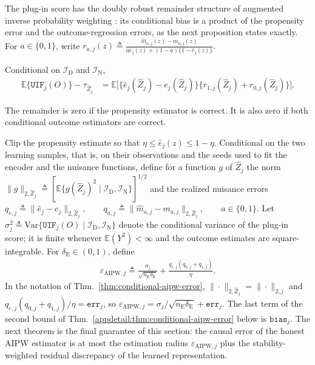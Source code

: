 The plug-in score has the doubly robust remainder structure of augmented inverse probability weighting \citep{chernozhukov2017double,kennedy2022semiparametric}: its conditional bias is a product of the propensity error and the outcome-regression errors, as the next proposition states exactly. For $a\in\{0,1\}$, write
\(r_{a,j}(z) \triangleq \frac{\widehat m_{a,j}(z)-m_{a,j}(z)} {a\widehat e_j(z)+(1-a)\{1-\widehat e_j(z)\}}.\)
\begin{proposition}
\label{appdetail:prop:aipw-remainder}
\normalfont
Conditional on $\mathcal I_{\mathrm D}$ and $\mathcal I_{\mathrm N}$,
\begin{align}
\mathbb E\{\mathtt{UIF}_j(O)\}-\tau_{\widehat Z_j} &= \mathbb E\Big[ \{\widehat e_j(\widehat Z_j)-e_j(\widehat Z_j)\} \{r_{1,j}(\widehat Z_j)+r_{0,j}(\widehat Z_j)\} \Big].
\label{eq:aipw-remainder}
\end{align}
\end{proposition}

The remainder is zero if the propensity estimator is correct. It is also zero if both conditional outcome estimators are correct.

Clip the propensity estimate so that $\eta\le\widehat e_j(z)\le1-\eta$. Conditional on the two learning samples, that is, on their observations and the seeds used to fit the encoder and the nuisance functions, define for a function $g$ of $\widehat Z_j$ the norm $\|g\|_{2,\widehat Z_j}\triangleq[\mathbb E\{g(\widehat Z_j)^2\mid\mathcal I_{\mathrm D},\mathcal I_{\mathrm N}\}]^{1/2}$ and the realized nuisance errors
\(q_{e,j}\triangleq\|\widehat e_j-e_j\|_{2,\widehat Z_j}, \qquad q_{a,j}\triangleq\|\widehat m_{a,j}-m_{a,j}\|_{2,\widehat Z_j}, \qquad a\in\{0,1\}.\)
Let $\sigma_j^2\triangleq\mathrm{Var}\{\mathtt{UIF}_j(O)\mid\mathcal I_{\mathrm D},\mathcal I_{\mathrm N}\}$ denote the conditional variance of the plug-in score; it is finite whenever $\mathbb E(Y^2)<\infty$ and the outcome estimates are square-integrable. For $\delta_{\mathrm E}\in(0,1)$, define
\begin{align}
\varepsilon_{\mathrm{AIPW},j}
\triangleq
\frac{\sigma_j}{\sqrt{n_{\mathrm E}\delta_{\mathrm E}}}
+
\frac{q_{e,j}(q_{0,j}+q_{1,j})}{\eta}.
\label{eq:aipw-error-radius}
\end{align}
In the notation of Thm.~\ref{thm:conditional-aipw-error}, $\|\cdot\|_{2,\widehat Z_j}=\|\cdot\|_{2,j}$ and $q_{e,j}(q_{0,j}+q_{1,j})/\eta=\mathtt{err}_j$, so $\varepsilon_{\mathrm{AIPW},j}=\sigma_j/\sqrt{n_{\mathrm E}\delta_{\mathrm E}}+\mathtt{err}_j$. The last term of the second bound of Thm.~\ref{appdetail:thm:conditional-aipw-error} below is $\mathtt{bias}_j$.
The next theorem is the final guarantee of this section: the causal error of the honest AIPW estimator is at most the estimation radius $\varepsilon_{\mathrm{AIPW},j}$ plus the stability-weighted residual discrepancy of the learned representation.

